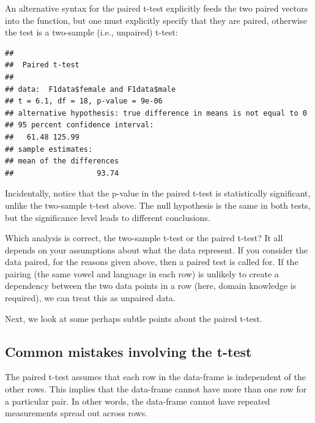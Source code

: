 \documentclass[12pt,]{krantz}
\newenvironment{Shaded}{\begin{snugshade}}{\end{snugshade}}
\newcommand{\DataTypeTok}[1]{\textcolor[rgb]{0.13,0.29,0.53}{#1}}
\newcommand{\KeywordTok}[1]{\textcolor[rgb]{0.13,0.29,0.53}{\textbf{#1}}}
\newcommand{\NormalTok}[1]{#1}
\newcommand{\OperatorTok}[1]{\textcolor[rgb]{0.81,0.36,0.00}{\textbf{#1}}}
\newcommand{\OtherTok}[1]{\textcolor[rgb]{0.56,0.35,0.01}{#1}}
\begin{document}
An alternative syntax for the paired t-test explicitly feeds the two paired vectors into the function, but one must explicitly specify that they are paired, otherwise the test is a two-sample (i.e., unpaired) t-test:

\begin{Shaded}
\end{Shaded}

\begin{verbatim}
## 
## 	Paired t-test
## 
## data:  F1data$female and F1data$male
## t = 6.1, df = 18, p-value = 9e-06
## alternative hypothesis: true difference in means is not equal to 0
## 95 percent confidence interval:
##   61.48 125.99
## sample estimates:
## mean of the differences 
##                   93.74
\end{verbatim}

Incidentally, notice that the p-value in the paired t-test is statistically significant, unlike the two-sample t-test above. The null hypothesis is the same in both tests, but the significance level leads to different conclusions.

Which analysis is correct, the two-sample t-test or the paired t-test? It all depends on your assumptions about what the data represent. If you consider the data paired, for the reasons given above, then a paired test is called for. If the pairing (the same vowel and language in each row) is unlikely to create a dependency between the two data points in a row (here, domain knowledge is required), we can treat this as unpaired data.

Next, we look at some perhaps subtle points about the paired t-test.

\hypertarget{common-mistakes-involving-the-t-test}{%
\subsection{Common mistakes involving the t-test}\label{common-mistakes-involving-the-t-test}}

The paired t-test assumes that each row in the data-frame is independent of the other rows. This implies that the data-frame cannot have more than one row for a particular pair. In other words, the data-frame cannot have repeated measurements spread out across rows.
\end{document}
